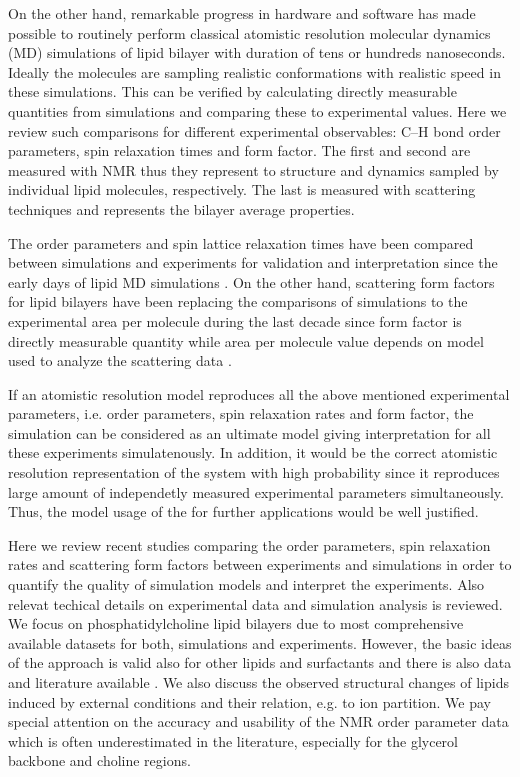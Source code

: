 \documentclass[aps,prl,superscriptaddress,twocolumn]{revtex4}
\begin{document}
On the other hand, remarkable progress in hardware and software has made possible to 
routinely perform classical atomistic resolution molecular dynamics (MD) simulations of lipid bilayer with 
duration of tens or hundreds nanoseconds. Ideally the molecules are sampling realistic
conformations with realistic speed in these simulations. This can be verified by calculating
directly measurable quantities from simulations and comparing these to experimental values.
Here we review such comparisons for different experimental observables: C--H bond order parameters,
spin relaxation times and form factor. The first and second are measured with NMR thus they 
represent to structure and dynamics sampled by individual lipid molecules, respectively.
The last is measured with scattering techniques and represents the bilayer average properties.

The order parameters and spin lattice relaxation times have been compared between simulations
and experiments for validation and interpretation since the early days of lipid MD simulations \cite{ploeg82,pastor88}.
On the other hand, scattering form factors for lipid bilayers have been replacing the 
comparisons of simulations to the experimental area per molecule during the last decade
since form factor is directly measurable quantity while area per molecule value depends on
model used to analyze the scattering data \cite{nagle00}.

If an atomistic resolution model reproduces all the above mentioned experimental parameters,
i.e. order parameters, spin relaxation rates and form factor, the simulation can be considered
as an ultimate model giving interpretation for all these experiments simulatenously.
In addition, it would be the correct atomistic resolution representation of the system with high
probability since it reproduces large amount of independetly measured experimental parameters 
simultaneously. Thus, the model usage of the for further applications would be well justified.

Here we review recent studies comparing the order parameters, spin relaxation rates
and scattering form factors between experiments and simulations in order to quantify the quality
of simulation models and interpret the experiments. Also relevat techical details on experimental
data and simulation analysis is reviewed. We focus on phosphatidylcholine lipid
bilayers due to most comprehensive available datasets for both, simulations and experiments.
However, the basic ideas of the approach is valid also for other lipids and surfactants and there
is also data and literature available \cite{??}. We also discuss the observed structural changes of
lipids induced by external conditions and their relation, e.g. to ion partition. 
We pay special attention on the accuracy and usability of the NMR order parameter data which
is often underestimated in the literature, especially for the glycerol backbone and choline
regions.
 
\end{document}
